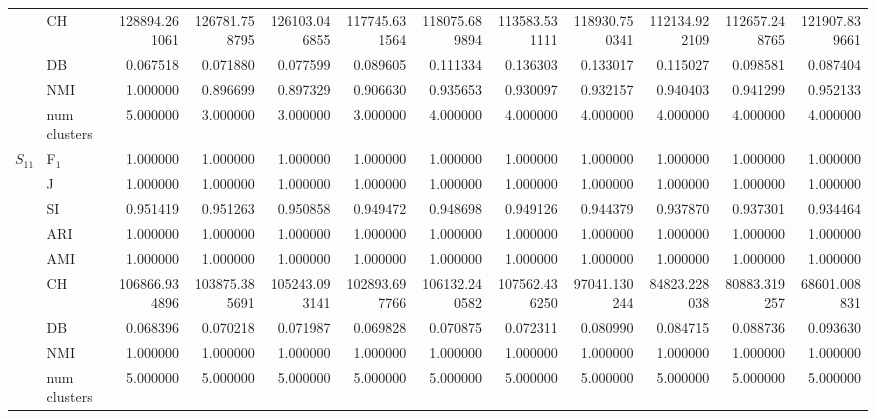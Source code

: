\begin{tabular}{llrrrrrrrrrr}
 & CH & 128894.261061 & 126781.758795 & 126103.046855 & 117745.631564 & 118075.689894 & 113583.531111 & 118930.750341 & 112134.922109 & 112657.248765 & 121907.839661 \\
 & DB & 0.067518 & 0.071880 & 0.077599 & 0.089605 & 0.111334 & 0.136303 & 0.133017 & 0.115027 & 0.098581 & 0.087404 \\
 & NMI & 1.000000 & 0.896699 & 0.897329 & 0.906630 & 0.935653 & 0.930097 & 0.932157 & 0.940403 & 0.941299 & 0.952133 \\
 & num clusters & 5.000000 & 3.000000 & 3.000000 & 3.000000 & 4.000000 & 4.000000 & 4.000000 & 4.000000 & 4.000000 & 4.000000 \\
\multirow[c]{9}{*}{$S_{11}$} & F$_1$ & 1.000000 & 1.000000 & 1.000000 & 1.000000 & 1.000000 & 1.000000 & 1.000000 & 1.000000 & 1.000000 & 1.000000 \\
 & J & 1.000000 & 1.000000 & 1.000000 & 1.000000 & 1.000000 & 1.000000 & 1.000000 & 1.000000 & 1.000000 & 1.000000 \\
 & SI & 0.951419 & 0.951263 & 0.950858 & 0.949472 & 0.948698 & 0.949126 & 0.944379 & 0.937870 & 0.937301 & 0.934464 \\
 & ARI & 1.000000 & 1.000000 & 1.000000 & 1.000000 & 1.000000 & 1.000000 & 1.000000 & 1.000000 & 1.000000 & 1.000000 \\
 & AMI & 1.000000 & 1.000000 & 1.000000 & 1.000000 & 1.000000 & 1.000000 & 1.000000 & 1.000000 & 1.000000 & 1.000000 \\
 & CH & 106866.934896 & 103875.385691 & 105243.093141 & 102893.697766 & 106132.240582 & 107562.436250 & 97041.130244 & 84823.228038 & 80883.319257 & 68601.008831 \\
 & DB & 0.068396 & 0.070218 & 0.071987 & 0.069828 & 0.070875 & 0.072311 & 0.080990 & 0.084715 & 0.088736 & 0.093630 \\
 & NMI & 1.000000 & 1.000000 & 1.000000 & 1.000000 & 1.000000 & 1.000000 & 1.000000 & 1.000000 & 1.000000 & 1.000000 \\
 & num clusters & 5.000000 & 5.000000 & 5.000000 & 5.000000 & 5.000000 & 5.000000 & 5.000000 & 5.000000 & 5.000000 & 5.000000 \\
\bottomrule
\end{tabular}
